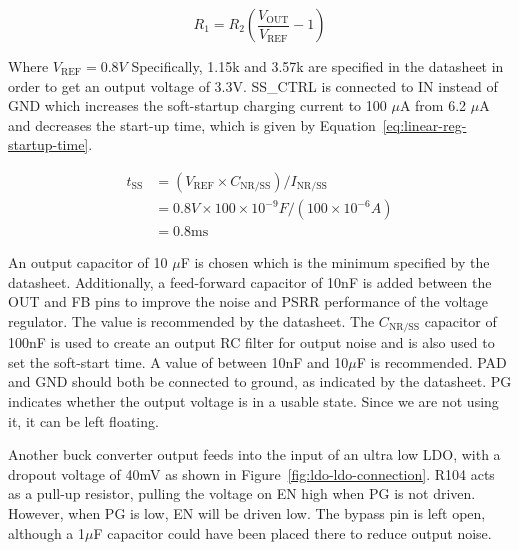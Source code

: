 \begin{equation}
        R_1 = R_2\left(\frac{V_{\text{OUT}}}{V_{\text{REF}}}-1\right) \label{eq:linear-reg-vout}
\end{equation}

Where $V_{\text{REF}} = 0.8V$ Specifically, 1.15k and 3.57k are specified in the datasheet in order
to get an output voltage of 3.3V. SS\_CTRL is connected to IN instead of GND which increases the
soft-startup charging current to 100 $\mu$A from 6.2 $\mu$A and decreases the start-up time, which
is given by Equation~\ref{eq:linear-reg-startup-time}.

\begin{align}
  t_{\text{SS}} &= (V_{\text{REF}} \times C_{\text{NR/SS}}) /
                  I_{\text{NR/SS}} \label{eq:linear-reg-startup-time} \\
                &= 0.8V \times 100 \times 10^{-9} F/(100 \times 10^{-6} A) \\
                &= 0.8\text{ms}
\end{align}

An output capacitor of 10 $\mu$F is chosen which is the minimum specified by the
datasheet. Additionally, a feed-forward capacitor of 10nF is added between the OUT and FB pins to
improve the noise and PSRR performance of the voltage regulator. The value is recommended by the
datasheet. The $C_{\text{NR/SS}}$ capacitor of 100nF is used to create an output RC filter for
output noise and is also used to set the soft-start time. A value of between 10nF and 10$\mu$F is
recommended. PAD and GND should both be connected to ground, as indicated by the datasheet. PG
indicates whether the output voltage is in a usable state. Since we are not using it, it can be left
floating.

Another buck converter output feeds into the input of an ultra low LDO, with a dropout voltage of
40mV as shown in Figure~\ref{fig:ldo-ldo-connection}. R104 acts as a pull-up resistor, pulling the
voltage on EN high when PG is not driven. However, when PG is low, EN will be driven low. The bypass
pin is left open, although a 1$\mu$F capacitor could have been placed there to reduce output noise.


